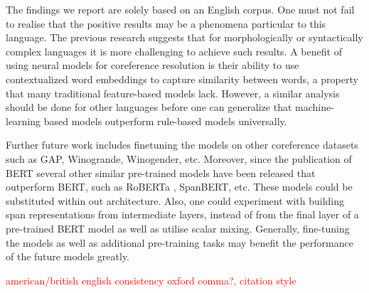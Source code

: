 \documentclass[11pt]{article}
\newcommand\todo[1]{\textcolor{red}{#1}}
\begin{document}
The findings we report are solely based on an English corpus. One must not fail to realise that the positive results may be a phenomena particular to this language. The previous research \parencite{russian, other-lang} suggests that for morphologically or syntactically complex languages it is more challenging to achieve such results. A benefit of using neural models for coreference resolution is their ability to use contextualized word embeddings to capture similarity between words, a property that many traditional feature-based models lack. However, a similar analysis should be done for other languages before one can generalize that machine-learning based models outperform rule-based models universally.

Further future work includes finetuning the models on other coreference datasets such as GAP, Winogrande, Winogender, etc. Moreover, since the publication of BERT several other similar pre-trained models have been released that outperform BERT, such as RoBERTa \parencite{roberta}, SpanBERT\parencite{spanbert}, etc. These models could be substituted within out architecture. Also, one could experiment with building span representations from intermediate layers, instead of from the final layer of a pre-trained BERT model as well as utilise scalar mixing. Generally, fine-tuning the models as well as additional pre-training tasks may benefit the performance of the future models greatly. 


 \todo{american/british english consistency} 
 \todo{oxford comma?, citation style }

\printbibliography
\end{document}
